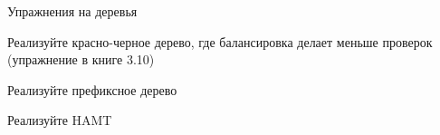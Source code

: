 \begin{frame}{Упражнения на деревья}
\begin{exercise}[\exscore{1}{2}{1}]
Реализуйте красно-черное дерево, где балансировка делает меньше проверок (упражнение в книге 3.10)
\end{exercise}


\begin{exercise}[\exscore{2}{2}{1}]
Реализуйте префиксное дерево
\end{exercise}

\begin{exercise}[\exscore{3}{3}{1}]
Реализуйте HAMT
\end{exercise}

\end{frame}
